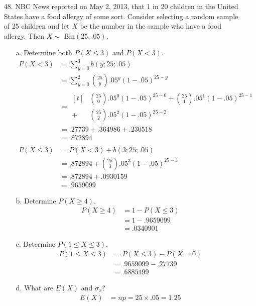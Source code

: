 \documentclass[letterpaper,12pt]{article}
\newcommand{\bp}[3]{%
  \binom{#2}{#1}#3^#1(1 - #3)^{#2 - #1}%
}
\begin{document}
\begin{enumerate}
\begin{enumerate}
    \end{enumerate}
  \item[48.]
    NBC News reported on May 2, 2013, that 1 in 20 children in the United States have a food allergy of some sort. Consider selecting a random sample of 25 children and let $X$ be the number in the sample who have a food allergy. Then $X \sim$ Bin$(25, .05)$.
    \begin{enumerate}
      \item[a.]
        Determine both $P(X \le 3)$ and $P(X < 3)$.
        \begin{align*}
          P(X < 3) &= \sum_{y = 0}^3 b(y; 25; .05) \\
          &= \sum_{y = 0}^2 \bp{y}{25}{.05} \\
          &= \begin{aligned}[t]
            &\bp{0}{25}{.05} + \bp{1}{25}{.05} \\
            + &\bp{2}{25}{.05}
          \end{aligned} \\
          &= .27739 + .364986 + .230518 \\
          &= .872894 \\
          \\
          P(X \le 3) &= P(X < 3) + b(3; 25; .05) \\
          &= .872894 + \bp{3}{25}{.05} \\
          &= .872894 + .0930159 \\
          &= .9659099
        \end{align*}
      \item[b.]
        Determine $P(X \ge 4)$.
        \begin{align*}
          P(X \ge 4) &= 1 - P(X \le 3) \\
          &= 1 - .9659099 \\
          &= .0340901
        \end{align*}
      \item[c.]
        Determine $P(1 \le X \le 3)$.
        \begin{align*}
          P(1 \le X \le 3) &= P(X \le 3) - P(X = 0) \\
          &= .9659099 - .27739 \\
          &= .6885199
        \end{align*}
      \item[d.]
        What are $E(X)$ and $\sigma_x$?
        \begin{align*}
          E(X) &= np = 25 \times .05 = 1.25 \\

\end{align*}
\end{enumerate}
\end{enumerate}
\end{document}
